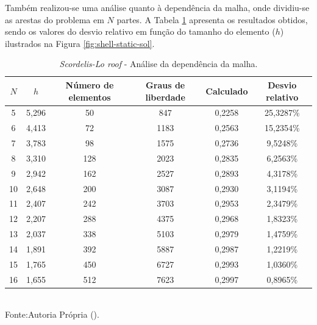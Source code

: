 Também realizou-se uma análise quanto à dependência da malha, onde dividiu-se as arestas do problema em $N$ partes. A Tabela \ref{tab:scordelis-sol} apresenta os resultados obtidos, sendo os valores do desvio relativo em função do tamanho do elemento ($h$) ilustrados na Figura \ref{fig:shell-static-sol}.

\begin{table}[h!]
    \centering
    \caption{\textit{Scordelis-Lo roof} - Análise da dependência da malha.}
    \begin{tabular}{cccccc}
        \hline
        $N$ & $h$   & Número de elementos & Graus de liberdade & Calculado & Desvio relativo \\\hline
        5   & 5,296 & 50                  & 847                & 0,2258    & 25,3287\%       \\
        6   & 4,413 & 72                  & 1183               & 0,2563    & 15,2354\%       \\
        7   & 3,783 & 98                  & 1575               & 0,2736    & 9,5248\%        \\
        8   & 3,310 & 128                 & 2023               & 0,2835    & 6,2563\%        \\
        9   & 2,942 & 162                 & 2527               & 0,2893    & 4,3178\%        \\
        10  & 2,648 & 200                 & 3087               & 0,2930    & 3,1194\%        \\
        11  & 2,407 & 242                 & 3703               & 0,2953    & 2,3479\%        \\
        12  & 2,207 & 288                 & 4375               & 0,2968    & 1,8323\%        \\
        13  & 2,037 & 338                 & 5103               & 0,2979    & 1,4759\%        \\
        14  & 1,891 & 392                 & 5887               & 0,2987    & 1,2219\%        \\
        15  & 1,765 & 450                 & 6727               & 0,2993    & 1,0360\%        \\
        16  & 1,655 & 512                 & 7623               & 0,2997    & 0,8965\%        \\\hline
    \end{tabular}
    \\Fonte:Autoria Própria (\the\year).
    \label{tab:scordelis-sol}
\end{table}

